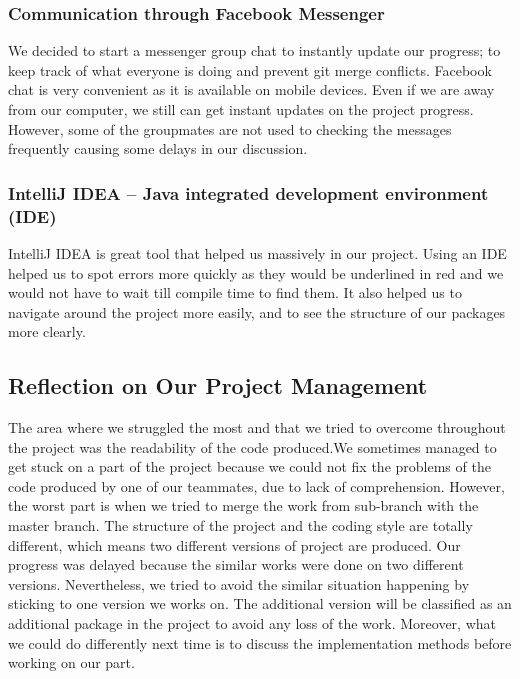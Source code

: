 \documentclass[a4paper]{article}
\theoremstyle{definition}
\begin{document}
\subsubsection{Communication through Facebook Messenger}
We decided to start a messenger group chat to instantly update our progress; to keep track of what everyone is doing and prevent git merge conflicts. Facebook chat is very convenient as it is available on mobile devices. Even if we are away from our computer, we still can get instant updates on the project progress. However, some of the groupmates are not used to checking the messages frequently causing some delays in our discussion.

\subsubsection{IntelliJ IDEA -- Java integrated development environment (IDE)}
IntelliJ IDEA is great tool that helped us massively in our project. Using an IDE helped us to spot errors more quickly as they would be underlined in red and we would not have to wait till compile time to ﬁnd them. It also helped us to navigate around the project more easily, and to see the structure of our packages more clearly.

\subsection{Reflection on Our Project Management}
The area where we struggled the most and that we tried to overcome throughout the project was the readability of the code produced.We sometimes managed to get stuck on a part of the project because we could not fix the problems of the code produced by one of our teammates, due to lack of comprehension. However, the worst part is when we tried to merge the work from sub-branch with the master branch. The structure of the project and the coding style are totally different, which means two different versions of project are produced. Our progress was delayed because the similar works were done on two different versions. Nevertheless, we tried to avoid the similar situation happening by sticking to one version we works on. The additional version will be classified as an additional package in the project to avoid any loss of the work. Moreover, what we could do differently next time is to discuss the implementation methods before working on our part.

\end{document}
